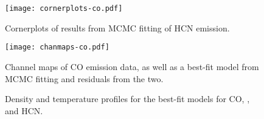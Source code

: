
\begin{figure}[htp]
  \hspace*{\fill}%
  \texttt{[image: cornerplots-co.pdf]}\hfill%
  \hspace*{\fill}%
  \caption{Cornerplots of results from MCMC fitting of HCN emission.}
  \label{fig:co_cornerplots}
\end{figure}


\begin{figure}[htp]
  \hspace*{\fill}%
  \texttt{[image: chanmaps-co.pdf]}\hfill%
  \hspace*{\fill}%
  \caption{Channel maps of CO emission data, as well as a best-fit model from MCMC fitting and residuals from the two.}
  \label{fig:co_chanmaps}
\end{figure}










\begin{figure}[htp]
  \centering
    \hspace*{\fill}%
    \vfill%
    \vfill%
    \hspace*{\fill}%
    \caption{Density and temperature profiles for the best-fit models for CO, \hco, and HCN.}
    \label{fig:bf_disk_strs}
\end{figure}

